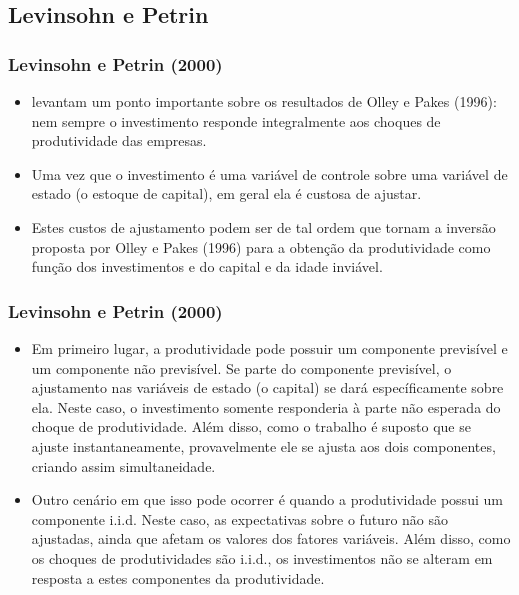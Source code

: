 \documentclass{beamer}
\begin{document}
\subsection{Levinsohn e Petrin}

\begin{frame}\frametitle{Levinsohn e Petrin (2000)}
\begin{itemize}
\item \citet{Levinsohn2000} levantam um ponto importante sobre os resultados
de Olley e Pakes (1996): nem sempre o investimento responde integralmente
aos choques de produtividade das empresas. 
\item Uma vez que o investimento é uma variável de controle sobre uma variável
de estado (o estoque de capital), em geral ela é custosa de ajustar. 
\item Estes custos de ajustamento podem ser de tal ordem que tornam a inversão
proposta por Olley e Pakes (1996) para a obtenção da produtividade
como função dos investimentos e do capital e da idade inviável. 
\end{itemize}
\end{frame}

\begin{frame}\frametitle{Levinsohn e Petrin (2000)}

\begin{itemize}
\item Em primeiro lugar, a produtividade pode possuir um componente previsível
e um componente não previsível. Se parte do componente previsível,
o ajustamento nas variáveis de estado (o capital) se dará específicamente
sobre ela. Neste caso, o investimento somente responderia à parte
não esperada do choque de produtividade. Além disso, como o trabalho
é suposto que se ajuste instantaneamente, provavelmente ele se ajusta
aos dois componentes, criando assim simultaneidade.
\item Outro cenário em que isso pode ocorrer é quando a produtividade possui
um componente i.i.d. Neste caso, as expectativas sobre o futuro não
são ajustadas, ainda que afetam os valores dos fatores variáveis.
Além disso, como os choques de produtividades são i.i.d., os investimentos
não se alteram em resposta a estes componentes da produtividade.
\end{itemize}
\end{frame}
\end{document}
